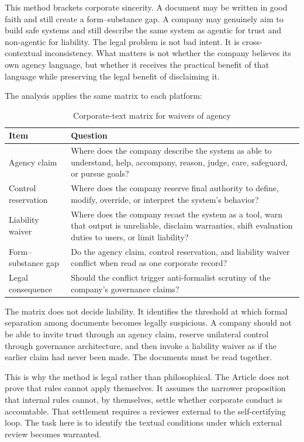 \documentclass[11pt,a4paper]{article}
\begin{document}
This method brackets corporate sincerity. A document may be written in good faith and still create a form--substance gap. A company may genuinely aim to build safe systems and still describe the same system as agentic for trust and non-agentic for liability. The legal problem is not bad intent. It is cross-contextual inconsistency. What matters is not whether the company believes its own agency language, but whether it receives the practical benefit of that language while preserving the legal benefit of disclaiming it.

The analysis applies the same matrix to each platform:

\begin{table}[htbp]
\centering
\small
\caption{Corporate-text matrix for waivers of agency}
\label{tab:matrix}
\begin{tabularx}{\textwidth}{@{}P{3.4cm}Y@{}}
\toprule
\textbf{Item} & \textbf{Question} \\
\midrule
Agency claim & Where does the company describe the system as able to understand, help, accompany, reason, judge, care, safeguard, or pursue goals? \\
Control reservation & Where does the company reserve final authority to define, modify, override, or interpret the system's behavior? \\
Liability waiver & Where does the company recast the system as a tool, warn that output is unreliable, disclaim warranties, shift evaluation duties to users, or limit liability? \\
Form--substance gap & Do the agency claim, control reservation, and liability waiver conflict when read as one corporate record? \\
Legal consequence & Should the conflict trigger anti-formalist scrutiny of the company's governance claims? \\
\bottomrule
\end{tabularx}
\end{table}

The matrix does not decide liability. It identifies the threshold at which formal separation among documents becomes legally suspicious. A company should not be able to invite trust through an agency claim, reserve unilateral control through governance architecture, and then invoke a liability waiver as if the earlier claim had never been made. The documents must be read together.

This is why the method is legal rather than philosophical. The Article does not prove that rules cannot apply themselves. It assumes the narrower proposition that internal rules cannot, by themselves, settle whether corporate conduct is accountable. That settlement requires a reviewer external to the self-certifying loop. The task here is to identify the textual conditions under which external review becomes warranted.
\end{document}
